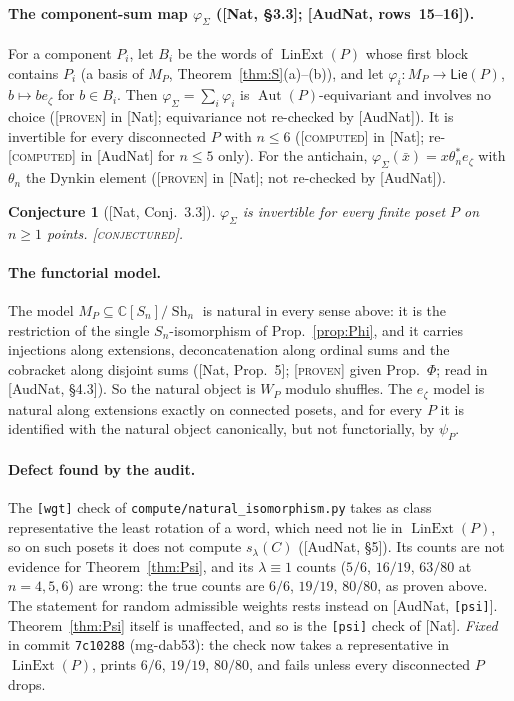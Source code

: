 \documentclass[11pt]{article}
\newtheorem{conjecture}[theorem]{Conjecture}
\theoremstyle{definition}
\theoremstyle{remark}
\newcommand{\Lin}{\operatorname{LinExt}}
\newcommand{\Aut}{\operatorname{Aut}}
\newcommand{\PLie}{\mathsf{Lie}}
\newcommand{\Sh}{\operatorname{Sh}}
\newcommand{\st}[1]{\textup{[\textsc{#1}]}}
\newcommand{\src}[1]{\nolinkurl{#1}}
\begin{document}
\paragraph{The component-sum map $\varphi_\Sigma$ ([Nat, \S3.3]; [AudNat, rows~15--16]).}
For a component $P_i$, let $B_i$ be the words of $\Lin(P)$ whose first block
contains $P_i$ (a basis of $M_P$, Theorem~\ref{thm:S}(a)--(b)), and let
$\varphi_i:M_P\to\PLie(P)$, $b\mapsto be_\zeta$ for $b\in B_i$. Then
$\varphi_\Sigma=\sum_i\varphi_i$ is $\Aut(P)$-equivariant and involves no
choice (\st{proven} in [Nat]; equivariance not re-checked by [AudNat]). It is invertible for every disconnected $P$ with
$n\le6$ (\st{computed} in [Nat]; re-\st{computed} in [AudNat] for $n\le5$
only). For the antichain, $\varphi_\Sigma(\bar x)=x\theta_n^*e_\zeta$ with
$\theta_n$ the Dynkin element (\st{proven} in [Nat]; not re-checked by
[AudNat]).

\begin{conjecture}[{[Nat, Conj.~3.3]}]\label{conj:phisigma}
$\varphi_\Sigma$ is invertible for every finite poset $P$ on $n\ge1$ points. \st{conjectured}.
\end{conjecture}

\paragraph{The functorial model.} The model $M_P\subseteq\mathbb C[S_n]/\Sh_n$
is natural in every sense above: it is the restriction of the single
$S_n$-isomorphism of Prop.~\ref{prop:Phi}, and it carries injections along
extensions, deconcatenation along ordinal sums and the cobracket along
disjoint sums ([Nat, Prop.~5]; \st{proven} given Prop.~$\Phi$; read in
[AudNat, \S4.3]). So the natural object is $W_P$ modulo shuffles. The
$e_\zeta$ model is natural along extensions exactly on connected posets, and
for every $P$ it is identified with the natural object canonically, but not
functorially, by $\psi_P$.

\paragraph{Defect found by the audit.} The \texttt{[wgt]} check of
\src{compute/natural_isomorphism.py} takes as class representative the
least rotation of a word, which need not lie in $\Lin(P)$, so on such posets
it does not compute $s_\lambda(C)$ ([AudNat, \S5]). Its counts are not
evidence for Theorem~\ref{thm:Psi}, and its $\lambda\equiv1$ counts
($5/6$, $16/19$, $63/80$ at $n=4,5,6$) are wrong: the true counts are
$6/6$, $19/19$, $80/80$, as proven above. The statement for random admissible
weights rests instead on [AudNat, \texttt{[psi]}]. Theorem~\ref{thm:Psi}
itself is unaffected, and so is the \texttt{[psi]} check of [Nat].
\emph{Fixed} in commit \texttt{7c10288} (mg-dab53): the check now takes a
representative in $\Lin(P)$, prints $6/6$, $19/19$, $80/80$, and fails unless
every disconnected $P$ drops.
\end{document}
